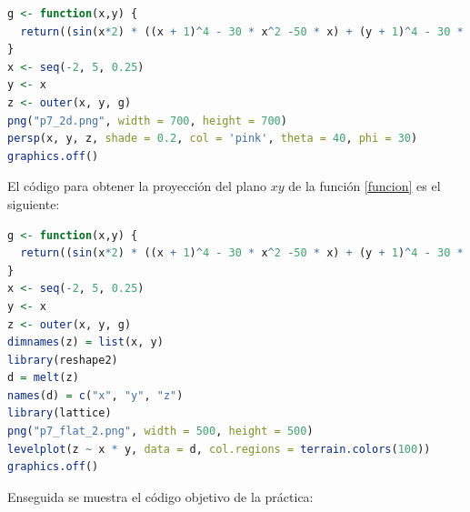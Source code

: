 \documentclass{article}
\begin{document}
\lstset{style=mystyle}
\begin{lstlisting}[language=R, caption= Código graficar la función \eqref{funcion} en 3D.]
g <- function(x,y) {
  return((sin(x*2) * ((x + 1)^4 - 30 * x^2 -50 * x) + (y + 1)^4 - 30 * y^2 - 50 * y))
}
x <- seq(-2, 5, 0.25) 
y <- x
z <- outer(x, y, g)
png("p7_2d.png", width = 700, height = 700)
persp(x, y, z, shade = 0.2, col = 'pink', theta = 40, phi = 30)
graphics.off()
\end{lstlisting}

El código para obtener la proyección del plano $xy$ de la función \eqref{funcion} es el siguiente:

\lstset{style=mystyle}
\begin{lstlisting}[language=R, caption= Código para la proyección del plano $xy$.]
g <- function(x,y) {
  return((sin(x*2) * ((x + 1)^4 - 30 * x^2 -50 * x) + (y + 1)^4 - 30 * y^2 - 50 * y))
}
x <- seq(-2, 5, 0.25) 
y <- x
z <- outer(x, y, g)
dimnames(z) = list(x, y)
library(reshape2)
d = melt(z)
names(d) = c("x", "y", "z")
library(lattice)
png("p7_flat_2.png", width = 500, height = 500)
levelplot(z ~ x * y, data = d, col.regions = terrain.colors(100))
graphics.off()
\end{lstlisting}

Enseguida se muestra el código objetivo de la práctica:
\end{document}
